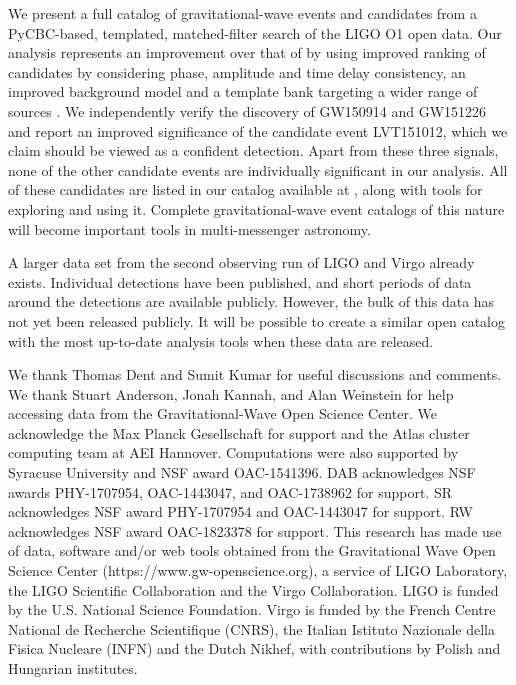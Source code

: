 We present a full catalog of gravitational-wave events and candidates from a PyCBC-based, templated, matched-filter search of the LIGO O1 open data.  Our analysis represents an improvement over that of \cite{TheLIGOScientific:2016pea,Abbott:2016ymx} by using improved ranking of candidates by considering phase, amplitude and time delay consistency, an improved background model and a template bank targeting a wider range of sources \citep{Nitz:2017svb, Nitz:2017lco,DalCanton:2017ala}. We independently verify the discovery of GW150914 and GW151226 and report an improved significance of the candidate event LVT151012, which we claim should be viewed as a confident detection.  Apart from these three signals, none of the other candidate events are individually significant in our analysis.  All of these candidates are listed in our catalog available at \release{}, along with tools for exploring and using it. Complete gravitational-wave event catalogs of this nature will become important tools in multi-messenger astronomy.

A  larger data set from the second observing run of LIGO and Virgo already exists. Individual detections have been published, and short periods of data around the detections are available publicly.  However, the bulk of this data has not yet been released publicly. It will be possible to create a similar open catalog with the most up-to-date analysis tools when these data are released.


We thank Thomas Dent and Sumit Kumar for useful discussions and comments. We thank Stuart Anderson, Jonah Kannah, and Alan Weinstein for help accessing data from the Gravitational-Wave Open Science Center.  We acknowledge the Max Planck Gesellschaft for support and the Atlas cluster computing team at AEI Hannover. Computations were also supported by Syracuse University and NSF award OAC-1541396. DAB acknowledges NSF awards PHY-1707954, OAC-1443047, and OAC-1738962 for support. SR acknowledges NSF award PHY-1707954 and OAC-1443047 for support. RW acknowledges NSF award OAC-1823378 for support. 
This research has made use of data, software and/or web tools obtained from the Gravitational Wave Open Science Center (https://www.gw-openscience.org), a service of LIGO Laboratory, the LIGO Scientific Collaboration and the Virgo Collaboration. LIGO is funded by the U.S. National Science Foundation. Virgo is funded by the French Centre National de Recherche Scientifique (CNRS), the Italian Istituto Nazionale della Fisica Nucleare (INFN) and the Dutch Nikhef, with contributions by Polish and Hungarian institutes.
